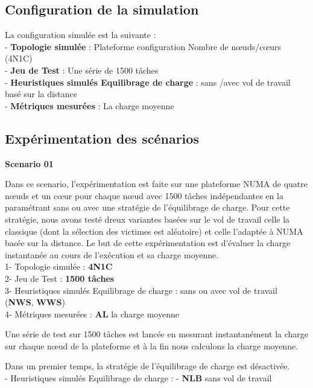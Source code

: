 \subsection{Configuration de la simulation}%
La configuration simulée est la suivante :\\
- \textbf{Topologie simulée} : Plateforme configuration Nombre de nœuds/cœurs (4N1C)\\  %
- \textbf{Jeu de Test} : Une série de 1500 tâches\\
- \textbf{Heuristiques simulés Equilibrage de charge} : sans /avec vol de travail basé sur la distance\\
- \textbf{Métriques mesurées} : La charge moyenne\\  %
\subsection{Expérimentation des scénarios}
%
\textbf{Scenario 01} 

Dans ce scenario, l'expérimentation est faite sur une plateforme NUMA de quatre nœuds et un cœur pour chaque nœud avec 1500 tâches indépendantes en la paramétrant sans ou avec une stratégie de l'équilibrage de charge.  Pour cette stratégie, nous avons testé dreux variantes basées sur le vol de travail celle la classique (dont la sélection des victimes est aléatoire) et celle l'adaptée à NUMA basée sur la distance. Le but de cette expérimentation est d'évaluer la charge instantanée au cours de l'exécution et sa charge moyenne.\\
1- Topologie simulée : \textbf{4N1C}\\
2- Jeu de Test : \textbf{1500 tâches}\\
3- Heuristiques simulés Equilibrage de charge : sans ou avec vol de travail (\textbf{NWS}, \textbf{WWS})\\ 
4- Métriques mesurées : \textbf{AL} la charge moyenne

Une série de test sur 1500 tâches est lancée en mesurant instantanément la charge sur chaque nœud de la plateforme et à la fin 
nous calculons la charge moyenne. 

Dans un premier temps, la stratégie de l'équilibrage de charge est désactivée. \\
- Heuristiques simulés Equilibrage de charge : - \textbf{NLB} sans vol de travail

